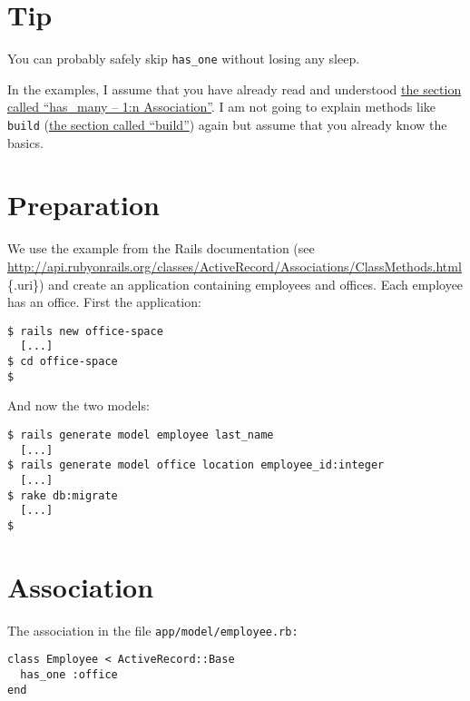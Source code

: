 \documentclass[a4paper]{book}
\begin{document}
\section{Tip}\label{tip-8}

You can probably safely skip \texttt{has\_one} without losing any sleep.

In the examples, I assume that you have already read and understood \hyperref[activerecordux5fhasux5fmany]{the section called “has\_many -- 1:n Association”}. I am not going to explain methods like \texttt{build} (\hyperref[activerecordux5fhinzufuegenux5fbuild]{the section called “build”}) again but assume that you already know the basics.

\section{Preparation}\label{preparation-1}

We use the example from the Rails documentation (see \url{http://api.rubyonrails.org/classes/ActiveRecord/Associations/ClassMethods.html}\{.uri\}) and create an application containing employees and offices. Each employee has an office. First the application:

\begin{shaded}\begin{verbatim}
$ rails new office-space
  [...]
$ cd office-space
$
\end{verbatim}\end{shaded}

And now the two models:

\begin{shaded}\begin{verbatim}
$ rails generate model employee last_name
  [...]
$ rails generate model office location employee_id:integer
  [...]
$ rake db:migrate
  [...]
$
\end{verbatim}\end{shaded}

\section{Association}\label{association}

The association in the file \texttt{app/model/employee.rb:}

\begin{shaded}\begin{verbatim}
class Employee < ActiveRecord::Base
  has_one :office
end
\end{verbatim}\end{shaded}
\end{document}
